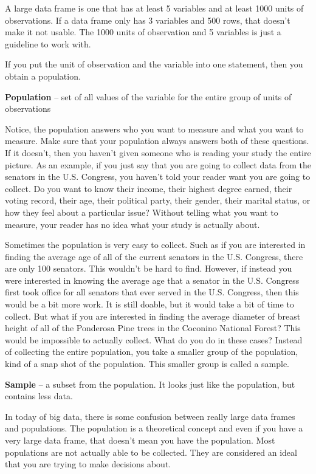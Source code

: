 \documentclass[
]{book}
\begin{document}
A large data frame is one that has at least 5 variables and at least 1000 units of observations. If a data frame only has 3 variables and 500 rows, that doesn't make it not usable. The 1000 units of observation and 5 variables is just a guideline to work with.

If you put the unit of observation and the variable into one statement, then you obtain a population.

\textbf{Population} -- set of all values of the variable for the entire group of units of observations

Notice, the population answers who you want to measure and what you want to measure. Make sure that your population always answers both of these questions. If it doesn't, then you haven't given someone who is reading your study the entire picture. As an example, if you just say that you are going to collect data from the senators in the U.S. Congress, you haven't told your reader want you are going to collect. Do you want to know their income, their highest degree earned, their voting record, their age, their political party, their gender, their marital status, or how they feel about a particular issue? Without telling what you want to measure, your reader has no idea what your study is actually about.

Sometimes the population is very easy to collect. Such as if you are interested in finding the average age of all of the current senators in the U.S. Congress, there are only 100 senators. This wouldn't be hard to find. However, if instead you were interested in knowing the average age that a senator in the U.S. Congress first took office for all senators that ever served in the U.S. Congress, then this would be a bit more work. It is still doable, but it would take a bit of time to collect. But what if you are interested in finding the average diameter of breast height of all of the Ponderosa Pine trees in the Coconino National Forest? This would be impossible to actually collect. What do you do in these cases? Instead of collecting the entire population, you take a smaller group of the population, kind of a snap shot of the population. This smaller group is called a sample.

\textbf{Sample} -- a subset from the population. It looks just like the population, but contains less data.

In today of big data, there is some confusion between really large data frames and populations. The population is a theoretical concept and even if you have a very large data frame, that doesn't mean you have the population. Most populations are not actually able to be collected. They are considered an ideal that you are trying to make decisions about.
\end{document}
